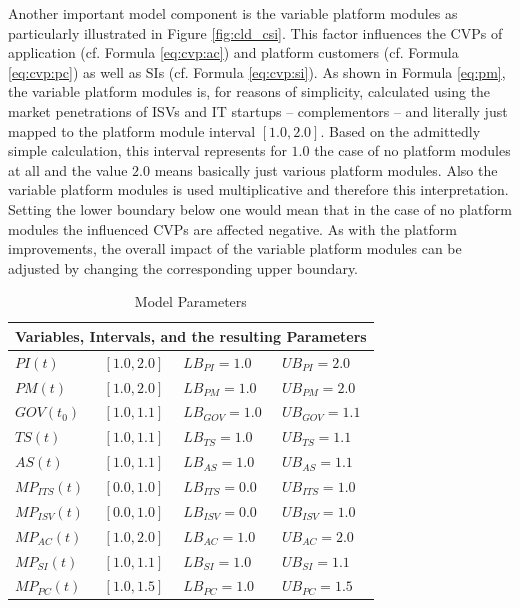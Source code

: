 Another important model component is the variable platform modules as particularly illustrated in Figure \ref{fig:cld_csi}. This factor influences the \acp{CVP} of application (cf. Formula \ref{eq:cvp:ac}) and platform customers (cf. Formula \ref{eq:cvp:pc}) as well as \acp{SI} (cf. Formula \ref{eq:cvp:si}). As shown in Formula \ref{eq:pm}, the variable platform modules is, for reasons of simplicity, calculated using the market penetrations of \acp{ISV} and \ac{IT} startups -- complementors -- and literally just mapped to the platform module interval $[1.0,2.0]$. Based on the admittedly simple calculation, this interval represents for $1.0$ the case of no platform modules at all and the value $2.0$ means basically just various platform modules. Also the variable platform modules is used multiplicative and therefore this interpretation. Setting the lower boundary below one would mean that in the case of no platform modules the influenced \acp{CVP} are affected negative. As with the platform improvements, the overall impact of the variable platform modules can be adjusted by changing the corresponding upper boundary.

\begin{table}[t]
	\centering
	\begin{tabular}{llll}
			\toprule 
			\multicolumn{4}{c}{\footnotesize \textbf{Variables, Intervals, and the resulting Parameters}}\\ \midrule
			\footnotesize $PI(t)$ & \footnotesize $[1.0,2.0]$ & \footnotesize $LB_{PI} = 1.0$ & \footnotesize $UB_{PI} = 2.0$ \\ 
			\footnotesize $PM(t)$ & \footnotesize  $[1.0,2.0]$ & \footnotesize $LB_{PM} = 1.0$ & \footnotesize $UB_{PM} = 2.0$ \\ \midrule
			\footnotesize $GOV(t_0)$ & \footnotesize $[1.0,1.1]$ & \footnotesize $LB_{GOV} = 1.0$ & \footnotesize $UB_{GOV} = 1.1$ \\
			\footnotesize $TS(t)$ & \footnotesize $[1.0,1.1]$ & \footnotesize $LB_{TS} = 1.0$ & \footnotesize $UB_{TS} = 1.1$ \\
			\footnotesize $AS(t)$ & \footnotesize $[1.0,1.1]$ & \footnotesize $LB_{AS} = 1.0$ & \footnotesize $UB_{AS} = 1.1$ \\ \midrule
			\footnotesize $MP_{ITS}(t)$ & \footnotesize $[0.0,1.0]$ & \footnotesize $LB_{ITS} = 0.0$ & \footnotesize $UB_{ITS} = 1.0$ \\
			\footnotesize $MP_{ISV}(t)$ & \footnotesize $[0.0,1.0]$ & \footnotesize $LB_{ISV} = 0.0$ & \footnotesize $UB_{ISV} = 1.0$ \\
			\footnotesize $MP_{AC}(t)$ & \footnotesize $[1.0,2.0]$ & \footnotesize $LB_{AC} = 1.0$ & \footnotesize $UB_{AC} = 2.0$ \\
			\footnotesize $MP_{SI}(t)$ & \footnotesize $[1.0,1.1]$ & \footnotesize $LB_{SI} = 1.0$ & \footnotesize $UB_{SI} = 1.1$ \\
			\footnotesize $MP_{PC}(t)$ & \footnotesize $[1.0,1.5]$ & \footnotesize $LB_{PC} = 1.0$ & \footnotesize $UB_{PC} = 1.5$ \\ \bottomrule
	\end{tabular}
	\caption{Model Parameters}
	\label{tab:mpara}
\end{table}

